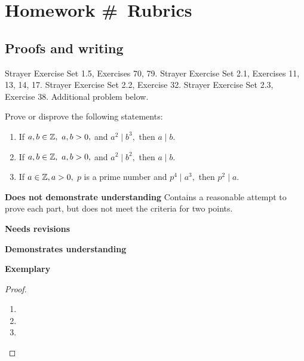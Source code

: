 \documentclass[letterpaper, 11pt]{../ximera}
\begin{document}
\chapter{Homework \#\homework\ Rubrics}

\section*{Proofs and writing}  %
Strayer Exercise Set 1.5, Exercises 70, 79.
Strayer Exercise Set 2.1, Exercises 11, 13, 14, 17.
Strayer Exercise Set 2.2, Exercise 32.
Strayer Exercise Set 2.3, Exercise 38.
Additional problem below.
\begin{ex} 
Prove or disprove the following statements:
  	\begin{enumerate}[label=(\alph*)] 
		\item If $a,b\in\mathbb Z,\ a,b>0,$ and $a^2\mid b^3,$ then $a\mid b$. 

		\item If $a,b\in\mathbb Z,\ a,b>0,$ and $a^2\mid b^2,$ then $a\mid b$. 
		
		\item If $a\in\mathbb Z, a>0,$ $p$ is a prime number and $p^4\mid a^3,$ then $p^2\mid a.$
	
	\end{enumerate}
 \end{ex}

\begin{writeRubric}
    \item \textbf{Does not demonstrate understanding}
     Contains a reasonable attempt to prove each part, but does not meet the criteria for two points.
    \item \textbf{Needs revisions}
     
    \item \textbf{Demonstrates understanding}
    
    \item \textbf{Exemplary}
        
\end{writeRubric}
                                       \begin{proof}
  	\begin{enumerate}[label=(\alph*)] 
		\item %

		\item %
		
		\item %


	\end{enumerate}
\end{proof}
\end{document}
